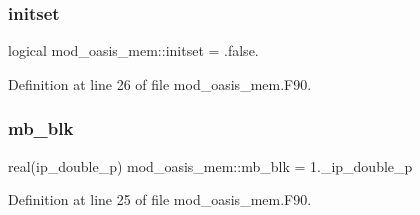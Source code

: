 \subsubsection{\texorpdfstring{initset}{initset}}
{\footnotesize\ttfamily logical mod\+\_\+oasis\+\_\+mem\+::initset = .false.\hspace{0.3cm}{\ttfamily [private]}}



Definition at line 26 of file mod\+\_\+oasis\+\_\+mem.\+F90.

\mbox{\label{namespacemod__oasis__mem_a7c262f1c120ed57d527ee3de91552ee9}} 
\subsubsection{\texorpdfstring{mb\+\_\+blk}{mb\_blk}}
{\footnotesize\ttfamily real(ip\+\_\+double\+\_\+p) mod\+\_\+oasis\+\_\+mem\+::mb\+\_\+blk = 1.\+\_\+ip\+\_\+double\+\_\+p\hspace{0.3cm}{\ttfamily [private]}}



Definition at line 25 of file mod\+\_\+oasis\+\_\+mem.\+F90.


